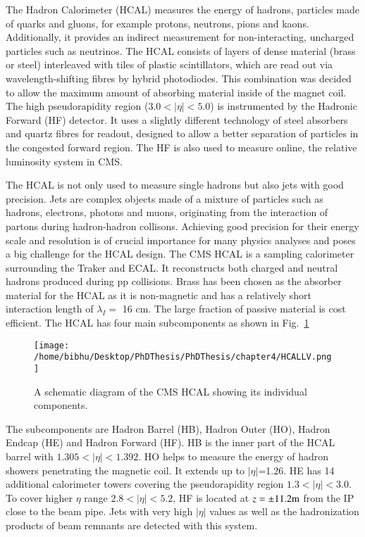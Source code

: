 The Hadron Calorimeter (HCAL) measures the energy of hadrons, particles made of quarks and gluons, for example protons, neutrons, pions and kaons. Additionally, it provides an indirect measurement for non-interacting, uncharged particles such as neutrinos. The HCAL consists of layers of dense material (brass or steel) interleaved with tiles of plastic scintillators, which are read out via wavelength-shifting   fibres by hybrid photodiodes. This combination was decided to allow the maximum amount of absorbing material inside of the magnet coil. The high pseudorapidity region ($3.0 < |\eta| < 5.0$)   is instrumented by the Hadronic Forward (HF) detector. It uses a slightly different technology of steel absorbers and quartz fibres for readout, designed to allow a better separation of particles in the congested forward region. The HF is also used to measure online, the relative luminosity system in CMS.

The HCAL is not only used to measure single hadrons but also jets with good precision. Jets are complex objects made of a mixture of particles such as hadrons, electrons, photons and muons, originating from the interaction of partons during hadron-hadron collisons. Achieving good precision for their energy scale and resolution is of crucial importance for many physics analyses and poses a big challenge for the HCAL  design. The CMS HCAL is a sampling calorimeter surrounding the Traker and ECAL. It reconstructs both charged and neutral hadrons produced during pp collisions. Brass has been chosen as the absorber material for the HCAL as it is non-magnetic and has a relatively short interaction length of $\lambda_{I} = $ 16 cm. The large fraction of passive material is cost efficient. The HCAL has four main subcomponents as shown in Fig.~\ref{fig:HCALLV}

\begin{figure}[h]
    \centering  
    \texttt{[image: /home/bibhu/Desktop/PhDThesis/PhDThesis/chapter4/HCALLV.png]}
    \caption{ \small A schematic diagram of the CMS HCAL showing its individual components.}
    \label{fig:HCALLV}
\end{figure}

The subcomponents are Hadron Barrel (HB), Hadron Outer (HO), Hadron Endcap (HE) and Hadron Forward (HF). HB is the inner part of the HCAL barrel with $1.305 < |\eta|<1.392$. HO helps to measure the energy of hadron showers penetrating the magnetic coil. It extends up to $|\eta| $=1.26. HE has 14 additional calorimeter towers covering the pseudorapidity region $1.3 <|\eta|<3.0$. To cover higher $\eta$ range $2.8<|\eta|<5.2$, HF is located at $ z= \pm 11.2 \rm m$ from the IP close to the beam pipe. Jets with very high $|\eta|$ values as well as the hadronization products of beam remnants are detected with this system.


